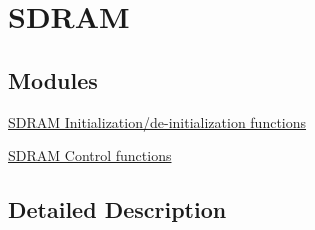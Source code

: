 \hypertarget{group___f_m_c___l_l___s_d_r_a_m}{}\section{S\+D\+R\+AM}
\label{group___f_m_c___l_l___s_d_r_a_m}
\subsection*{Modules}
\begin{DoxyCompactItemize}
\item 
\hyperlink{group___f_m_c___l_l___s_d_r_a_m___private___functions___group1}{S\+D\+R\+A\+M Initialization/de-\/initialization functions}
\item 
\hyperlink{group___f_m_c___l_l___s_d_r_a_m___private___functions___group2}{S\+D\+R\+A\+M Control functions}
\end{DoxyCompactItemize}


\subsection{Detailed Description}
